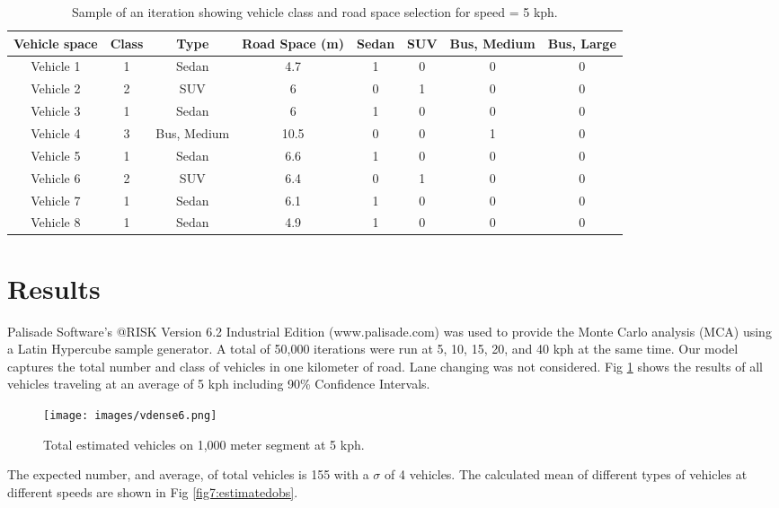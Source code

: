 \begin{table}[]
\centering
\caption{Sample of an iteration showing vehicle class and road space selection for speed = 5 kph.}
\label{tb3:selection}
\begin{tabular}{@{}cccccccc@{}}
\toprule
\textbf{Vehicle space} & \textbf{Class} & \textbf{Type} & \textbf{Road Space (m)} & \textbf{Sedan} & \textbf{SUV} & \textbf{Bus, Medium} & \textbf{Bus, Large} \\ \midrule
Vehicle 1 & 1 & Sedan & 4.7 & 1 & 0 & 0 & 0 \\
Vehicle 2 & 2 & SUV & 6 & 0 & 1 & 0 & 0 \\
Vehicle 3 & 1 & Sedan & 6 & 1 & 0 & 0 & 0 \\
Vehicle 4 & 3 & Bus, Medium & 10.5 & 0 & 0 & 1 & 0 \\
Vehicle 5 & 1 & Sedan & 6.6 & 1 & 0 & 0 & 0 \\
Vehicle 6 & 2 & SUV & 6.4 & 0 & 1 & 0 & 0 \\
Vehicle 7 & 1 & Sedan & 6.1 & 1 & 0 & 0 & 0 \\
Vehicle 8 & 1 & Sedan & 4.9 & 1 & 0 & 0 & 0 \\ \bottomrule
\end{tabular}
\end{table}

\section{Results}
Palisade Software’s @RISK Version 6.2 Industrial Edition (www.palisade.com) was used to provide the Monte Carlo analysis (MCA) using a Latin Hypercube sample generator.  A total of 50,000 iterations were run at 5, 10, 15, 20, and 40 kph at the same time.  Our model captures the total number and class of vehicles in one kilometer of road.  Lane changing was not considered.   Fig \ref{fig6:estimatedobs}  shows the results of all vehicles traveling at an average of 5 kph including 90\% Confidence Intervals.
 
%
\begin{figure}
\texttt{[image: images/vdense6.png]} 
\caption{Total estimated vehicles on 1,000 meter segment at 5 kph.}
\label{fig6:estimatedobs}
\end{figure}
%

The expected number, and average, of total vehicles is 155 with a $\sigma$ of 4 vehicles.  The calculated mean of different types of vehicles at different speeds are shown in Fig \ref{fig7:estimatedobs}.


